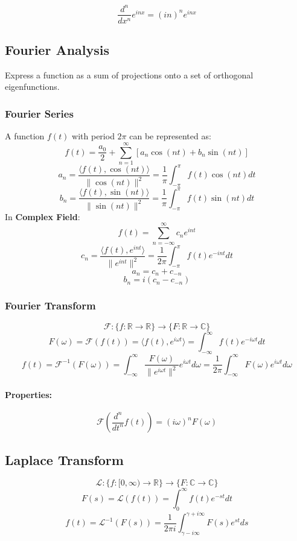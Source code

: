 \documentclass{article}
\begin{document}
\[
    \frac{d^n}{dx^n} e^{inx} = (in)^n e^{inx}
\]

\subsection{Fourier Analysis}

Express a function as a sum of projections onto a set of orthogonal eigenfunctions.

\subsubsection{Fourier Series}

A function $f(t)$ with period $2\pi$ can be represented as:
\[
    f(t) = \frac{a_0}{2} + \sum_{n=1}^{\infty} \left[a_n \cos(nt) + b_n \sin(nt)\right]
\]
\[
    a_n = \frac{\langle f(t), \cos(nt) \rangle}{\|\cos(nt)\|^2} = \frac{1}{\pi} \int_{-\pi}^{\pi} f(t) \cos(nt) dt
\]
\[
    b_n = \frac{\langle f(t), \sin(nt) \rangle}{\|\sin(nt)\|^2} = \frac{1}{\pi} \int_{-\pi}^{\pi} f(t) \sin(nt) dt
\]
In \textbf{Complex Field}:
\[
    f(t) = \sum_{n=-\infty}^{\infty} c_n e^{int}
\]
\[
    c_n = \frac{\langle f(t), e^{int} \rangle}{\|e^{int}\|^2} = \frac{1}{2\pi} \int_{-\pi}^{\pi} f(t) e^{-int} dt
\]
\[
    a_n = c_n + c_{-n}
\]
\[
    b_n = i(c_n - c_{-n})
\]

\subsubsection{Fourier Transform}

\[
    \mathcal{F}: \{f: \mathbb{R} \to \mathbb{R}\} \to \{F: \mathbb{R} \to \mathbb{C}\}
\]
\[
    F(\omega) = \mathcal{F}(f(t)) = \langle f(t), e^{i\omega t} \rangle = \int_{-\infty}^{\infty} f(t) e^{-i\omega t} dt
\]
\[
    f(t) = \mathcal{F}^{-1}(F(\omega)) = \int_{-\infty}^{\infty} \frac{F(\omega)}{\|e^{i\omega t}\|^2} e^{i\omega t} d\omega = \frac{1}{2\pi} \int_{-\infty}^{\infty} F(\omega) e^{i\omega t} d\omega
\]
\paragraph{Properties:}
\[
    \mathcal{F}\left(\frac{d^n}{dt^n} f(t)\right) = (i\omega)^n F(\omega)
\]

\subsection{Laplace Transform}

\[
    \mathcal{L}: \{f: [0, \infty) \to \mathbb{R}\} \to \{F: \mathbb{C} \to \mathbb{C}\}
\]
\[
    F(s) = \mathcal{L}(f(t)) = \int_0^{\infty} f(t) e^{-st} dt
\]
\[
    f(t) = \mathcal{L}^{-1}(F(s)) = \frac{1}{2\pi i} \int_{\gamma - i\infty}^{\gamma + i\infty} F(s) e^{st} ds
\]
\end{document}
